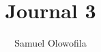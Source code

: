 \documentclass[12pt]{article}
\begin{document}
\title{Journal 3}
\author{Samuel Olowofila}
\date{}
\maketitle



\clearpage




\end{document}
